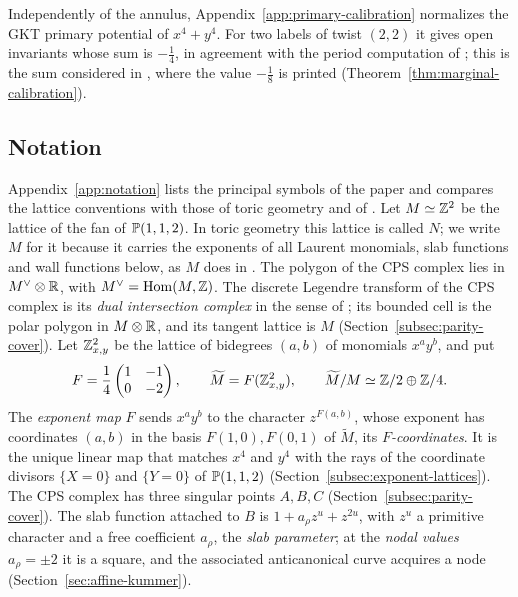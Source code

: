 Independently of the annulus, Appendix~\ref{app:primary-calibration}
normalizes the GKT primary potential of $x^4+y^4$.  For two labels of twist
$(2,2)$ it gives open invariants whose sum is $-\frac14$, in agreement with
the period computation of \cite[Rem.~4.3]{wuebben2026boundary}; this is the
sum considered in \cite[Ex.~5.5]{grossetal2026survey}, where the value
$-\frac18$ is printed (Theorem~\ref{thm:marginal-calibration}).

\subsection{Notation}\label{subsec:intro-notation}

Appendix~\ref{app:notation} lists the principal symbols of the paper and
compares the lattice conventions with those of toric geometry and of
\cite{grosssiebert2011,carletal2024}.
Let $M\simeq\mathbb Z^2$ be the lattice of the fan of $\mathbb P(1,1,2)$.  In toric
geometry this lattice is called $N$; we write $M$ for it because it carries
the exponents of all Laurent monomials, slab functions and wall functions
below, as $M$ does in \cite{grosspandharipandesiebert2010}.  The polygon of
the CPS complex lies in $M^\vee\otimes\mathbb R$, with
$M^\vee=\operatorname{Hom}(M,\mathbb Z)$.  The discrete Legendre transform of
the CPS complex is its \emph{dual intersection complex} in the sense of
\cite[\S7.1]{carletal2024}; its bounded cell is the polar polygon in
$M\otimes\mathbb R$, and its tangent lattice is $M$
(Section~\ref{subsec:parity-cover}).  Let
$\mathbb Z^2_{x,y}$ be the lattice of bidegrees $(a,b)$ of monomials $x^ay^b$, and
put
\begin{equation}\label{eq:intro-F}
 F=\frac14\begin{pmatrix}1&-1\\0&-2\end{pmatrix},
 \qquad \widetilde M=F(\mathbb Z^2_{x,y}),
 \qquad \widetilde M/M\simeq\mathbb Z/2\oplus\mathbb Z/4.
\end{equation}
The \emph{exponent map} $F$ sends $x^ay^b$ to the character $z^{F(a,b)}$,
whose exponent has coordinates $(a,b)$ in the basis $F(1,0),F(0,1)$ of
$\widetilde M$, its \emph{$F$-coordinates}.  It
is the unique linear map that matches $x^4$ and $y^4$ with the rays of the
coordinate divisors $\{X=0\}$ and $\{Y=0\}$ of $\mathbb P(1,1,2)$
(Section~\ref{subsec:exponent-lattices}).  The CPS complex has three
singular points $A,B,C$ (Section~\ref{subsec:parity-cover}).  The slab
function attached to $B$ is $1+a_\rho z^u+z^{2u}$, with $z^u$ a primitive
character and a free coefficient $a_\rho$, the \emph{slab parameter}; at the
\emph{nodal values} $a_\rho=\pm2$ it is a square, and the associated
anticanonical curve acquires a node (Section~\ref{sec:affine-kummer}).

